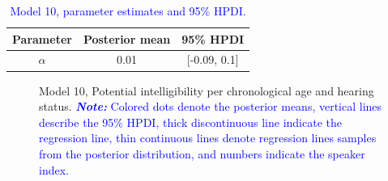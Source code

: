\documentclass[
  authoryear,
  preprint,
  1p]{elsarticle}
\begin{document}
\begin{longtable}[]{@{}ccc@{}}

\caption{\label{tbl-parameter-model10}\textcolor{blue}{Model 10, parameter estimates and
95\% HPDI.}}

\tabularnewline

\toprule\noalign{}
Parameter & Posterior mean & 95\% HPDI \\
\midrule\noalign{}
\endhead
\bottomrule\noalign{}
\endlastfoot
\(\alpha\) & 0.01 & {[}-0.09, 0.1{]} \\

\end{longtable}

\label{cell-fig-rq3-intelligibility-model10}
\begin{figure}[H]


\caption{\label{fig-rq3-intelligibility-model10}Model 10, Potential
intelligibility per chronological age and hearing status.
\textcolor{blue}{\textbf{\emph{Note:}} Colored dots denote the posterior means, vertical
lines describe the 95\% HPDI, thick discontinuous line indicate the
regression line, thin continuous lines denote regression lines samples
from the posterior distribution, and numbers indicate the speaker
index.}}

\end{figure}%
\end{document}
